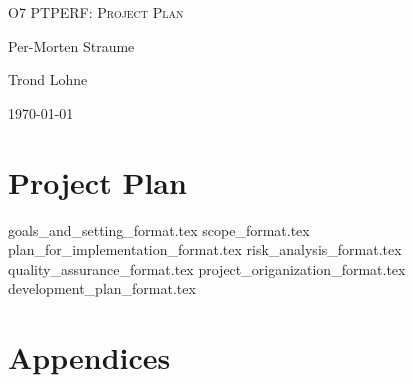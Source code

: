 \documentclass[hidelinks]{article}
\begin{document}

\begin{titlepage}
    \centering
    {\scshape\LARGE O7 PTPERF: Project Plan \par}
    \vspace{2cm}
    {Per-Morten Straume \par}
    {Trond Lohne \par}
    \vfill
    {\large \today\par}
\end{titlepage}

\pagebreak
\tableofcontents

\section*{Project Plan}
{goals_and_setting_format.tex}
{scope_format.tex}
{plan_for_implementation_format.tex}
{risk_analysis_format.tex}
{quality_assurance_format.tex}
{project_origanization_format.tex}
{development_plan_format.tex}




\pagebreak
\section*{Appendices}
\end{document}
